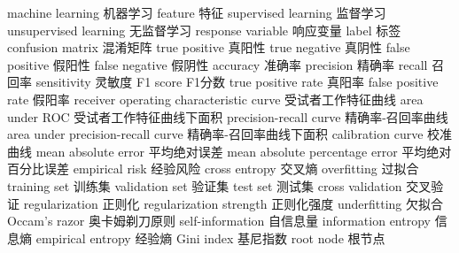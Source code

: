 {machine learning} 
{机器学习}
{feature} 
{特征}
{supervised learning} 
{监督学习}
{unsupervised learning} 
{无监督学习}
{response variable} 
{响应变量}
{label} 
{标签}
{confusion matrix} 
{混淆矩阵}
{true positive} 
{真阳性}
{true negative} 
{真阴性}
{false positive} 
{假阳性}
{false negative} 
{假阴性}
{accuracy} 
{准确率}
{precision} 
{精确率}
{recall} 
{召回率}
{sensitivity} 
{灵敏度}
{F1 score} 
{F1分数}
{true positive rate} 
{真阳率}
{false positive rate} 
{假阳率}
{receiver operating characteristic curve} 
{受试者工作特征曲线}
{area under ROC} 
{受试者工作特征曲线下面积}
{precision-recall curve} 
{精确率-召回率曲线}
{area under precision-recall curve} 
{精确率-召回率曲线下面积}
{calibration curve} 
{校准曲线}
{mean absolute error} 
{平均绝对误差}
{mean absolute percentage error} 
{平均绝对百分比误差}
{empirical risk} 
{经验风险}
{cross entropy} 
{交叉熵}
{overfitting}
{过拟合}
{training set}
{训练集}
{validation set}
{验证集}
{test set}
{测试集}
{cross validation}
{交叉验证}
{regularization}
{正则化}
{regularization strength}
{正则化强度}
{underfitting}
{欠拟合}
{Occam's razor}
{奥卡姆剃刀原则}
{self-information} 
{自信息量}
{information entropy} 
{信息熵}
{empirical entropy} 
{经验熵}
{Gini index} 
{基尼指数}
{root node} 
{根节点}
